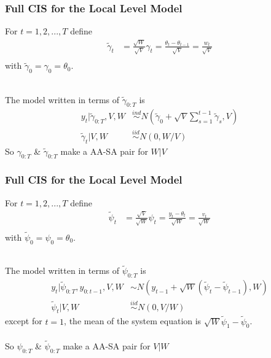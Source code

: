 \documentclass[xcolor=dvipsnames]{beamer}
\begin{document}
\begin{frame}
  \frametitle{Full CIS for the Local Level Model}
  For $t=1,2,...,T$ define
  \begin{align*}
    \tilde{\gamma}_t & = \frac{\sqrt{W}}{\sqrt{V}}\gamma_t = \frac{\theta_t - \theta_{t-1}}{\sqrt{V}} = \frac{w_t}{\sqrt{V}}\\
  \end{align*}
  with $\tilde{\gamma}_0=\gamma_0=\theta_0$.\\~\\
  \pause
  
  The model written in terms of $\tilde{\gamma}_{0:T}$ is
  \begin{align*}
  y_t|\tilde{\gamma}_{0:T}, V, W &\stackrel{ind}{\sim} N(\tilde{\gamma}_0 + \sqrt{V}\textstyle\sum_{s=1}^{t-1}\tilde{\gamma}_s, V)\\
  \tilde{\gamma}_t|V,W &\stackrel{iid}{\sim} N(0, W/V)
\end{align*}
So $\gamma_{0:T}$ \& $\tilde{\gamma}_{0:T}$ make a AA-SA pair for $W|V$
\end{frame}


\begin{frame}
  \frametitle{Full CIS for the Local Level Model}
  For $t=1,2,...,T$ define
  \begin{align*}
    \tilde{\psi}_t & = \frac{\sqrt{V}}{\sqrt{W}}\psi_t = \frac{y_t - \theta_{t}}{\sqrt{W}} = \frac{v_t}{\sqrt{W}}\\
  \end{align*}
  with $\tilde{\psi}_0=\psi_0=\theta_0$.\\~\\
  \pause
  
  The model written in terms of $\tilde{\psi}_{0:T}$ is
  \begin{align*}
  y_t|\tilde{\psi}_{0:T}, y_{0:t-1}, V, W & \sim N(y_{t-1} + \sqrt{W}(\tilde{\psi}_t - \tilde{\psi}_{t-1}), W)\\
  \tilde{\psi}_t|V,W &\stackrel{iid}{\sim}N(0,V/W)
\end{align*}
except for $t=1$, the mean of the system equation is $\sqrt{W}\tilde{\psi}_1 - \tilde{\psi}_0$.\\~\\

So $\psi_{0:T}$ \& $\tilde{\psi}_{0:T}$ make a AA-SA pair for $V|W$
\end{frame}
\end{document}
